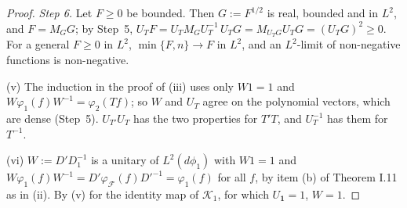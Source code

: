 \documentclass[11pt,a4paper]{article}
\theoremstyle{plain}
\theoremstyle{definition}
\theoremstyle{plain}
\theoremstyle{definition}
\begin{document}
\begin{proof}
\emph{Step 6.}  Let $F\ge0$ be bounded.  Then $G:=F^{1/2}$ is real, bounded and in $L^2$, and
$F=M_GG$; by Step~5, $U_TF=U_TM_GU_T^{-1}\,U_TG=M_{U_TG}U_TG=(U_TG)^2\ge0$.  For a general
$F\ge0$ in $L^2$, $\min\{F,n\}\to F$ in $L^2$, and an $L^2$-limit of non-negative functions is
non-negative.

(v) The induction in the proof of (iii) uses only $W1=1$ and $W\varphi_1(f)W^{-1}=
\varphi_2(Tf)$; so $W$ and $U_T$ agree on the polynomial vectors, which are dense (Step~5).
$U_{T'}U_T$ has the two properties for $T'T$, and $U_T^{-1}$ has them for $T^{-1}$.

(vi) $W:=D'D_1^{-1}$ is a unitary of $L^2(d\phi_1)$ with $W1=1$ and
$W\varphi_1(f)W^{-1}=D'\varphi_{\mathcal F}(f)D'^{-1}=\varphi_1(f)$ for all $f$, by item (b) of
Theorem I.11 as in (ii).  By (v) for the identity map of $\mathcal K_1$, for which
$U_{\mathbf 1}=1$, $W=1$.
\end{proof}
\end{document}
